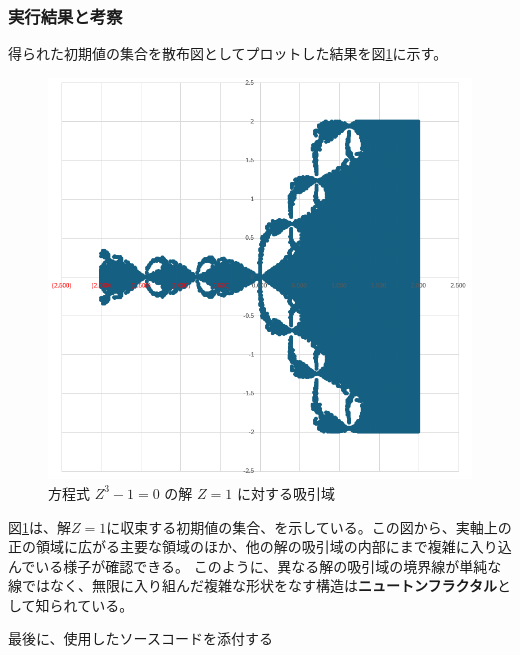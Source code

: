 \documentclass[dvipdfmx,a4paper]{jsarticle}
\begin{document}
\subsubsection{実行結果と考察}
得られた初期値の集合を散布図としてプロットした結果を図\ref{fig:newton_fractal}に示す。

\begin{figure}[htbp]
    \centering
    \includegraphics[width=0.8\linewidth]{summer/software-engineering/newton_fractal.png} 
    \caption{方程式 $Z^3-1=0$ の解 $Z=1$ に対する吸引域}
    \label{fig:newton_fractal}
\end{figure}

図\ref{fig:newton_fractal}は、解$Z=1$に収束する初期値の集合、を示している。この図から、実軸上の正の領域に広がる主要な領域のほか、他の解の吸引域の内部にまで複雑に入り込んでいる様子が確認できる。
このように、異なる解の吸引域の境界線が単純な線ではなく、無限に入り組んだ複雑な形状をなす構造は\textbf{ニュートンフラクタル}として知られている。



最後に、使用したソースコードを添付する

\end{document}
